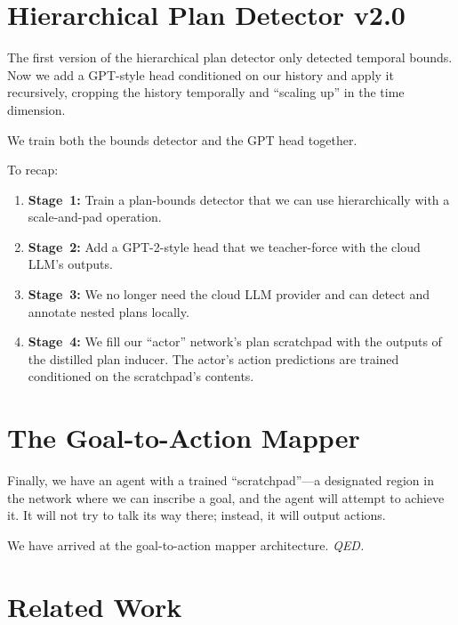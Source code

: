 \documentclass[12pt, a4paper]{article}
\begin{document}
\section{Hierarchical Plan Detector v2.0}

The first version of the hierarchical plan detector only detected temporal bounds. Now we add a GPT-style head conditioned on our history and apply it recursively, cropping the history temporally and ``scaling up'' in the time dimension.

We train both the bounds detector and the GPT head together.

To recap:

\begin{enumerate}
  \item \textbf{Stage~1:} Train a plan-bounds detector that we can use hierarchically with a scale-and-pad operation.
  \item \textbf{Stage~2:} Add a GPT-2-style head that we teacher-force with the cloud LLM's outputs.
  \item \textbf{Stage~3:} We no longer need the cloud LLM provider and can detect and annotate nested plans locally.
  \item \textbf{Stage~4:} We fill our ``actor'' network's plan scratchpad with the outputs of the distilled plan inducer. The actor's action predictions are trained conditioned on the scratchpad's contents.
\end{enumerate}

\section{The Goal-to-Action Mapper}

Finally, we have an agent with a trained ``scratchpad''---a designated region in the network where we can inscribe a goal, and the agent will attempt to achieve it. It will not try to talk its way there; instead, it will output actions.

We have arrived at the goal-to-action mapper architecture. \textit{QED.}

\section{Related Work}
\end{document}
